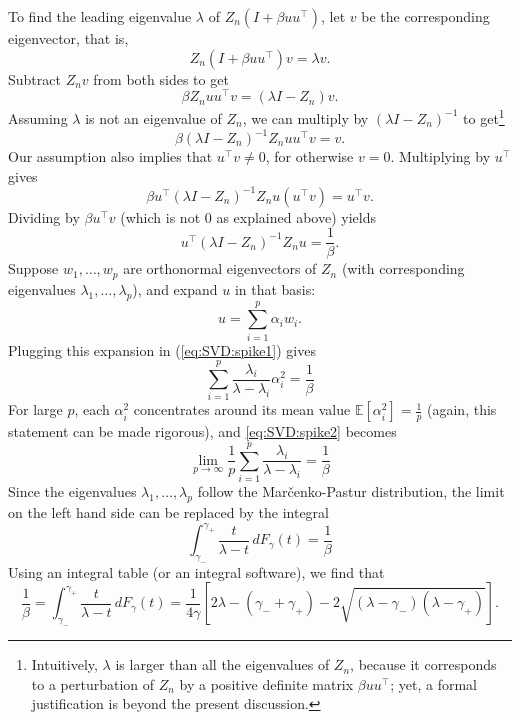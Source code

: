 To find the leading eigenvalue $\lambda$ of $Z_n(I + \beta uu^\top  )$, let $v$ be the corresponding eigenvector, that is,
\[
Z_n(I + \beta uu^\top  ) v = \lambda v.
\]
Subtract $Z_n v$ from both sides to get
\[
\beta Z_n uu^\top   v = (\lambda I - Z_n)v.
\]
Assuming $\lambda$ is not an eigenvalue of $Z_n$, we can multiply by $(\lambda I - Z_n)^{-1}$ to get\footnote{Intuitively, $\lambda$ is larger than all the eigenvalues of $Z_n$, because it corresponds to a perturbation of $Z_n$ by a positive definite matrix $\beta uu^\top  $; yet, a formal justification is beyond the present discussion.}
\[
\beta (\lambda I - Z_n)^{-1} Z_n uu^\top   v = v.
\]
Our assumption also implies that $u^\top   v \neq 0$, for otherwise $v=0$.
Multiplying by $u^\top  $ gives
\[
\beta u^\top   (\lambda I - Z_n)^{-1} Z_n u (u^\top   v) = u^\top   v.
\]
Dividing by $\beta u^\top   v$ (which is not 0 as explained above) yields
\begin{equation}\label{eq:SVD:spike1}
u^\top   (\lambda I - Z_n)^{-1} Z_n u = \frac{1}{\beta}.
\end{equation}
Suppose $w_1,\ldots,w_p$ are orthonormal eigenvectors of $Z_n$ (with corresponding eigenvalues $\lambda_1,\ldots, \lambda_p$), and expand $u$ in that basis:
\[ u = \sum_{i=1}^p \alpha_i w_i.\]
Plugging this expansion in (\ref{eq:SVD:spike1}) gives
\begin{equation}
\sum_{i=1}^p \frac{\lambda_i}{\lambda-\lambda_i} \alpha_i^2 = \frac{1}{\beta}\label{eq:SVD:spike2}
\end{equation}
For large $p$, each $\alpha_i^2$ concentrates around its mean value $\mathbb{E}[\alpha_i^2]=\frac{1}{p}$ (again, this statement can be made rigorous), and \eqref{eq:SVD:spike2} becomes
\begin{equation}
\lim_{p\to \infty} \frac{1}{p}\sum_{i=1}^p \frac{\lambda_i}{\lambda-\lambda_i} = \frac{1}{\beta}
\end{equation}
Since the eigenvalues $\lambda_1,\ldots,\lambda_p$ follow the Mar\v{c}enko-Pastur distribution, the limit on the left hand side can be replaced by the integral
\begin{equation}
\int_{\gamma_{-}}^{\gamma_{+}} \frac{t }{\lambda-t}\,d F_\gamma(t) = \frac{1}{\beta}
\end{equation}
Using an integral table (or an integral software), we find that
\begin{equation}
\frac{1}{\beta} = \int_{\gamma_{-}}^{\gamma_{+}} \frac{t }{\lambda-t}\,d F_\gamma(t) =\frac{1}{4 \gamma} \left[2 \lambda -(\gamma_{-}+\gamma_{+})- 2 \sqrt{(\lambda-\gamma_{-})(\lambda-\gamma_{+})}\right]. \label{eq:SVD:Integral}
\end{equation}

